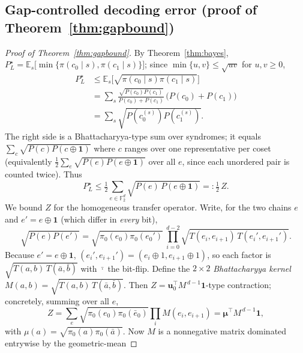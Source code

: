 \documentclass[reprint,aps,prxquantum,amsmath,amssymb,floatfix,nofootinbib,longbibliography]{revtex4-2}
\theoremstyle{definition}
\theoremstyle{remark}
\theoremstyle{plain}
\newcommand{\F}{\mathbb{F}}
\newcommand{\E}{\mathbb{E}}
\newcommand{\bone}{\mathbf 1}
\begin{document}
\subsection{Gap-controlled decoding error (proof of Theorem~\ref{thm:gapbound})}
\label{app:gapbound}

\begin{proof}[Proof of Theorem~\ref{thm:gapbound}]
By Theorem~\ref{thm:bayes},
$P_L^\star=\E_s\bigl[\min\{\pi(c_0\mid s),\pi(c_1\mid s)\}\bigr]$; since
$\min\{u,v\}\le\sqrt{uv}$ for $u,v\ge0$,
\begin{equation}
  \begin{split}
  P_L^\star&\le\E_s\bigl[\sqrt{\pi(c_0\mid s)\pi(c_1\mid s)}\bigr]\\
   &=\sum_s\frac{\sqrt{P(c_0)P(c_1)}}{P(c_0)+P(c_1)}\,\bigl(P(c_0)+P(c_1)\bigr)\\
   &=\sum_s\sqrt{P(c_0^{(s)})P(c_1^{(s)})}.
  \end{split}
  \label{eq:bhatt}
\end{equation}
The right side is a Bhattacharyya-type sum over syndromes; it equals
$\sum_{c}\sqrt{P(c)P(c\oplus\bone)}$ where $c$ ranges over one representative
per coset (equivalently $\tfrac12\sum_{e}\sqrt{P(e)P(e\oplus\bone)}$ over all
$e$, since each unordered pair is counted twice). Thus
\begin{equation}
  P_L^\star\le\tfrac12\sum_{e\in\F_2^d}\sqrt{P(e)\,P(e\oplus\bone)}
   =:\tfrac12\,Z .
  \label{eq:Zdef}
\end{equation}
We bound $Z$ for the homogeneous transfer operator. Write, for the two chains
$e$ and $e'=e\oplus\bone$ (which differ in \emph{every} bit),
\begin{equation}
  \sqrt{P(e)P(e')}
   =\sqrt{\pi_0(e_0)\pi_0(e_0')}\ \prod_{i=0}^{d-2}\sqrt{T(e_i,e_{i+1})\,T(e_i',e_{i+1}')}.
\end{equation}
Because $e'=e\oplus\bone$, $(e_i',e_{i+1}')=(e_i\oplus1,e_{i+1}\oplus1)$, so
each factor is $\sqrt{T(a,b)\,T(\bar a,\bar b)}$ with $\bar\cdot$ the bit-flip.
Define the $2\times2$ \emph{Bhattacharyya kernel}
$M(a,b)=\sqrt{T(a,b)\,T(\bar a,\bar b)}$. Then
$Z=\mathbf u_0^{\!\top}M^{\,d-1}\mathbf 1$-type contraction; concretely,
summing over all $e$,
\begin{equation}
  Z=\sum_{e}\sqrt{\pi_0(e_0)\pi_0(\bar e_0)}\prod_iM(e_i,e_{i+1})
   =\boldsymbol\mu^{\!\top}M^{\,d-1}\mathbf 1,
  \label{eq:Zprod}
\end{equation}
with $\mu(a)=\sqrt{\pi_0(a)\pi_0(\bar a)}$.
Now $M$ is a nonnegative matrix dominated entrywise by the geometric-mean

\end{proof}
\end{document}
